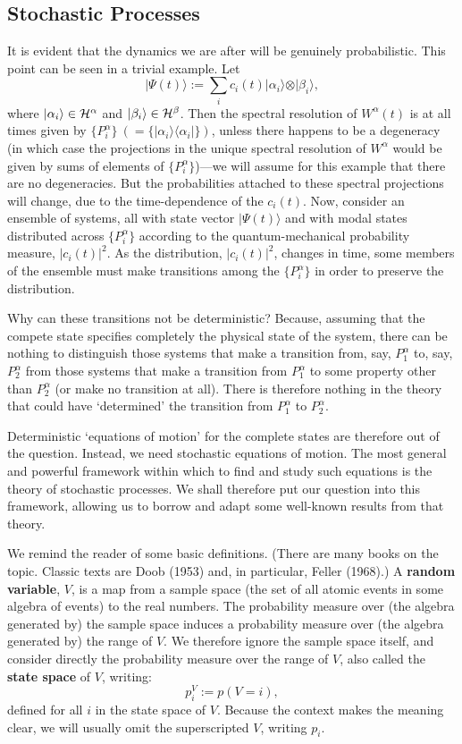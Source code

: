 \documentclass[12pt]{article}
\newcommand{\be}{\begin{equation}}
\newcommand{\ee}{\end{equation}}
\newcommand{\cH}{\cal{H}}                                       %
\newcommand{\ga}{\alpha}                                        %
\newcommand{\gb}{\beta}                                         %
\newcommand{\bra}[1]{\langle #1\vert}                           %
\newcommand{\ket}[1]{\vert #1\rangle}                           %
\begin{document}
\subsection{Stochastic Processes}


It is evident that the dynamics we are after will be genuinely
probabilistic.  This point can be seen in a trivial example.  Let
\be
\ket{\Psi(t)}:=\sum_{i} c_{i}(t)\ket{\ga_{i}}\otimes \ket{\gb_{i}},
\ee
\noindent where $\ket{\ga_{i}} \in \cH^{\ga}$ and $\ket{\gb_{i}} \in
\cH^{\gb}$.  Then the spectral resolution of $W^{\ga}(t)$ is at all
times given by $\{P^{\ga}_{i}\}\ (= \{\ket{\ga_{i}}\bra{\ga_{i}}\})$,
unless there happens to be a degeneracy (in which case the projections
in the unique spectral resolution of $W^{\ga}$ would be given by sums
of elements of $\{P^{\ga}_{i}\}$)---we will assume for this example
that there are no degeneracies.  But the probabilities attached to
these spectral projections will change, due to the time-dependence of
the $c_{i}(t)$.  Now, consider an ensemble of systems, all with
state vector $\ket{\Psi(t)}$ and with modal states distributed across
$\{P^{\ga}_{i}\}$ according to the quantum-mechanical probability
measure, $|c_{i}(t)|^{2}$.  As the distribution, $|c_{i}(t)|^{2}$,
changes in time, some members of the ensemble must make transitions
among the $\{P^{\ga}_{i}\}$ in order to preserve the distribution.

Why can these transitions not be deterministic?  Because, assuming 
that the compete state specifies completely the physical state of the 
system, there can be nothing to distinguish those systems that make a 
transition from, say, $P^{\ga}_{1}$ to, say, $P^{\ga}_{2}$ from those 
systems that make a transition from $P^{\ga}_{1}$ to some property 
other than $P^{\ga}_{2}$ (or make no transition at all).  There is 
therefore nothing in the theory that could have `determined' the 
transition from $P^{\ga}_{1}$ to $P^{\ga}_{2}$.

Deterministic `equations of motion' for the complete states are 
therefore out of the question.  Instead, we need stochastic equations 
of motion.  The most general and powerful framework within which to 
find and study such equations is the theory of stochastic processes.  
We shall therefore put our question into this framework, allowing us 
to borrow and adapt some well-known results from that theory.

We remind the reader of some basic definitions.  (There are many books 
on the topic.  Classic texts are Doob (1953) and, in particular, 
Feller (1968).) A {\bf random variable}, $V$, is a map from a sample 
space (the set of all atomic events in some algebra of events) to the 
real numbers.  The probability measure over (the algebra generated by) 
the sample space induces a probability measure over (the algebra 
generated by) the range of $V$.  We therefore ignore the sample space 
itself, and consider directly the probability measure over the range 
of $V$, also called the {\bf state space} of $V$, writing:
\be
p^{V}_{i} := p(V = i),
\ee
\noindent defined for all $i$ in the state space of $V$.  Because the
context makes the meaning clear, we will usually omit the
superscripted $V$, writing $p_{i}$.
\end{document}
